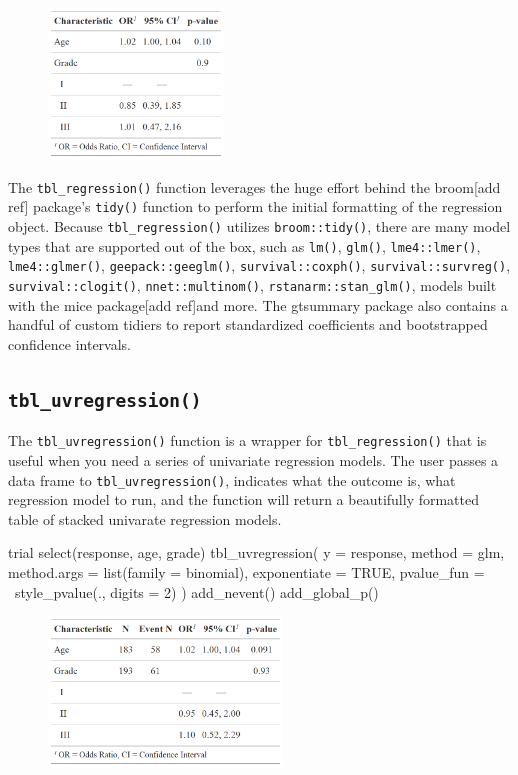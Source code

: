 \begin{figure}[h!]
  \includegraphics[height=4cm]{regression.png}
  \centering
\end{figure}

The \texttt{tbl\_regression()} function leverages the huge effort behind the broom[add ref] package's \texttt{tidy()} function to perform the initial formatting of the regression object.
Because \texttt{tbl\_regression()} utilizes \texttt{broom::tidy()}, there are many model types that are supported out of the box, such as \texttt{lm()}, \texttt{glm()}, \texttt{lme4::lmer()}, \texttt{lme4::glmer()}, \texttt{geepack::geeglm()}, \texttt{survival::coxph()}, \texttt{survival::survreg()}, \texttt{survival::clogit()}, \texttt{nnet::multinom()}, \texttt{rstanarm::stan\_glm()}, models built with the mice package[add ref]and more. The gtsummary package also contains a handful of custom tidiers to report standardized coefficients and bootstrapped confidence intervals.

\subsection{\texorpdfstring{\texttt{tbl\_uvregression()}}{tbl\_uvregression()}}

The \texttt{tbl\_uvregression()} function is a wrapper for \texttt{tbl\_regression()} that is useful when you need a series of univariate regression models.
The user passes a data frame to \texttt{tbl\_uvregression()}, indicates what the outcome is, what regression model to run, and the function will return a beautifully formatted table of stacked univarate regression models.

\begin{example}
trial %
  select(response, age, grade) %
  tbl_uvregression(
    y = response, 
    method = glm,
    method.args = list(family = binomial),
    exponentiate = TRUE,
    pvalue_fun = ~style_pvalue(., digits = 2)
  ) %
  add_nevent() %
  add_global_p()
\end{example}

\begin{figure}[h!]
  \includegraphics[height=4cm]{uvregression.png}
  \centering
\end{figure}

